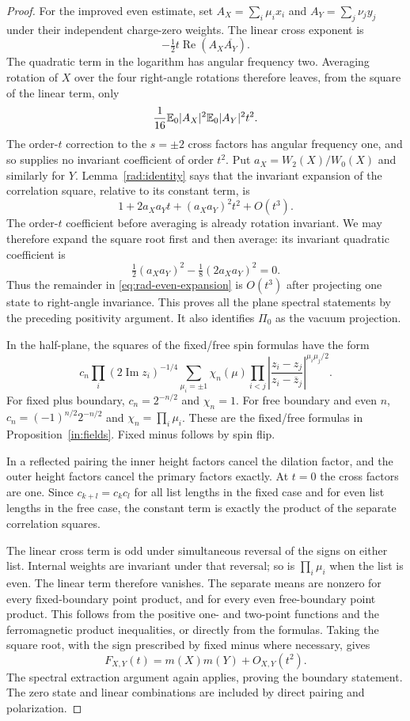 \begin{proof}
For the improved even estimate, set
$A_X=\sum_i\mu_i x_i$ and $A_Y=\sum_j\nu_j y_j$ under their
independent charge-zero weights.  The linear cross exponent is
\[
               -\tfrac12 t\operatorname{Re}(A_X\overline{A_Y}).
\]
The quadratic term in the logarithm has angular frequency two.
Averaging rotation of $X$ over the four right-angle rotations
therefore leaves, from the square of the linear term, only
\[
 \frac1{16}\mathbb E_0|A_X|^2\mathbb E_0|A_Y|^2t^2.
\]
The order-$t$ correction to the $s=\pm2$ cross factors has angular
frequency one, and so supplies no invariant coefficient of order
$t^2$.  Put $a_X=W_2(X)/W_0(X)$ and similarly for $Y$.
Lemma~\ref{rad:identity} says that the invariant expansion of the
correlation square, relative to its constant term, is
\[
                  1+2a_Xa_Yt+(a_Xa_Y)^2t^2+O(t^3).
\]
The order-$t$ coefficient before averaging is already rotation
invariant.  We may therefore expand the square root first and then
average: its invariant quadratic coefficient is
\[
             \tfrac12(a_Xa_Y)^2
                    -\tfrac18(2a_Xa_Y)^2=0.
\]
Thus the remainder in \eqref{eq:rad-even-expansion} is $O(t^3)$
after projecting one state to right-angle invariance.  This proves
all the plane spectral statements by the preceding positivity
argument.  It also identifies $\Pi_0$ as the vacuum projection.

In the half-plane, the squares of the fixed/free spin formulas
have the form
\begin{equation}
 c_n\prod_i(2\operatorname{Im}z_i)^{-1/4}
       \sum_{\mu_i=\pm1}\chi_n(\mu)
       \prod_{i<j}
       \left|\frac{z_i-z_j}{z_i-\overline z_j}\right|^{\mu_i\mu_j/2}.
 \label{eq:rad-halfplane-formula}
\end{equation}
For fixed plus boundary, $c_n=2^{-n/2}$ and $\chi_n=1$.  For free
boundary and even $n$, $c_n=(-1)^{n/2}2^{-n/2}$ and
$\chi_n=\prod_i\mu_i$.  These are the fixed/free formulas in
Proposition~\ref{in:fields}.  Fixed minus follows by spin flip.

In a reflected pairing the inner height factors cancel the
dilation factor, and the outer height factors cancel the primary
factors exactly.  At $t=0$ the cross factors are one.  Since
$c_{k+l}=c_kc_l$ for all list lengths in the fixed case and for even
list lengths in the free case, the constant term is exactly the
product of the separate correlation squares.

The linear cross term is odd under simultaneous reversal of the
signs on either list.  Internal weights are invariant under that
reversal; so is $\prod_i\mu_i$ when the list is even.  The linear
term therefore vanishes.  The separate means are nonzero for every
fixed-boundary point product, and for every even free-boundary point product.
This follows from the positive one- and two-point functions and
the ferromagnetic product inequalities, or directly from the
formulas.  Taking the square root, with the sign prescribed by
fixed minus where necessary, gives
\[
       F_{X,Y}(t)=m(X)m(Y)+O_{X,Y}(t^2).
\]
The spectral extraction argument again applies, proving the
boundary statement.  The zero state and linear combinations are
included by direct pairing and polarization.
\end{proof}

